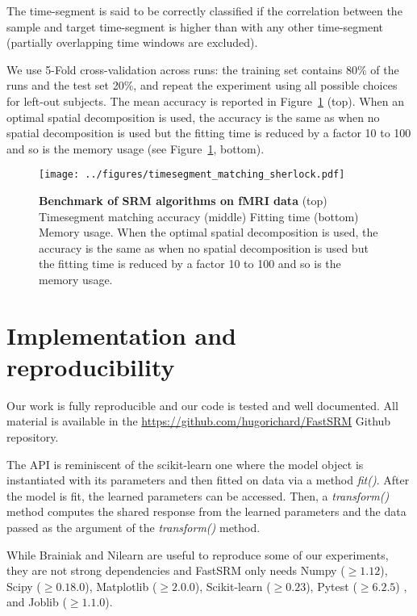 \documentclass{article}
\begin{document}
The time-segment is said to be
correctly classified if the correlation between the sample and target
time-segment is higher than with any other time-segment (partially overlapping
time windows are excluded).
%

% 
We use 5-Fold cross-validation across runs: the training set contains 80\% of
the runs and the test set 20\%, and repeat the experiment using all possible
choices for left-out subjects.
%
% 
The mean accuracy is reported in Figure~\ref{fig:srm:timesegment} (top).
%
When an optimal spatial decomposition is used, the accuracy is the same as when no
spatial decomposition is used but the fitting time is reduced by a factor 10 to 100
and so is the memory usage (see Figure~\ref{fig:srm:timesegment},
bottom).
%

% 

\begin{figure}
  \centering
  \texttt{[image: ../figures/timesegment\_matching\_sherlock.pdf]}
  \caption{\textbf{Benchmark of SRM algorithms on fMRI data} (top) Timesegment
    matching accuracy (middle) Fitting time (bottom) Memory usage. When the
    optimal spatial decomposition is used, the accuracy is the same as when no
    spatial decomposition is used but
    the fitting time is reduced by a factor 10 to 100 and so is the memory usage.
  }
  \label{fig:srm:timesegment}
\end{figure}

\section{Implementation and reproducibility}
Our work is fully reproducible and our code is tested and well documented. All
material is available in the \url{https://github.com/hugorichard/FastSRM} Github repository.

The API is reminiscent of the scikit-learn one where the model object is
instantiated with its parameters and then fitted on data via a method
\emph{fit()}. After the model is fit, the learned parameters can be accessed.
Then, a \emph{transform()} method computes the shared
response from the learned parameters and the data passed as the argument of the \emph{transform()} method.

While Brainiak and Nilearn are useful to reproduce some of our experiments, they
are not strong dependencies and FastSRM only needs Numpy ($\geq 1.12$), Scipy
($\geq 0.18.0$), Matplotlib ($\geq 2.0.0$), Scikit-learn ($\geq 0.23$), Pytest
($\geq 6.2.5$) , and Joblib ($\geq 1.1.0$).
\end{document}
